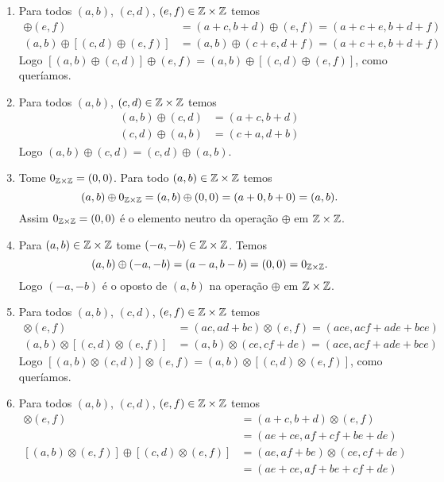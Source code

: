 \documentclass[12pt]{article}
\begin{document}
	\begin{enumerate}
		\item Para todos $(a, b)$, $(c, d)$, $(e, f) \in \mathbb{Z} \times \mathbb{Z}$ temos
		\begin{align*}
			[(a, b) \oplus (c, d)] \oplus (e, f) &= (a + c, b + d) \oplus (e, f) = (a + c + e, b + d + f)\\
			(a, b) \oplus [(c, d) \oplus (e, f)] &= (a, b) \oplus (c + e, d + f) = (a + c + e, b + d + f)
		\end{align*}
		Logo $[(a, b) \oplus (c, d)] \oplus (e, f) = (a, b) \oplus [(c, d) \oplus (e, f)]$, como queríamos.

		\item Para todos $(a, b)$, $(c, d) \in \mathbb{Z} \times \mathbb{Z}$ temos
		\begin{align*}
			(a, b) \oplus (c, d) &= (a + c, b + d)\\
			(c, d) \oplus (a, b) &= (c + a, d + b)
		\end{align*}
		Logo $(a, b) \oplus (c, d) = (c, d) \oplus (a, b)$.

		\item Tome $0_{\mathbb{Z} \times \mathbb{Z}} = (0, 0)$. Para todo $(a, b) \in \mathbb{Z} \times \mathbb{Z}$ temos
		\[
			(a, b) \oplus 0_{\mathbb{Z} \times \mathbb{Z}} = (a, b) \oplus (0, 0) = (a + 0, b + 0) = (a, b).
		\]
		Assim $0_{\mathbb{Z} \times \mathbb{Z}} = (0, 0)$ é o elemento neutro da operação $\oplus$ em $\mathbb{Z} \times \mathbb{Z}$.

		\item Para $(a, b) \in \mathbb{Z} \times \mathbb{Z}$ tome $(-a, -b) \in \mathbb{Z} \times \mathbb{Z}$. Temos
		\[
			(a, b) \oplus (-a, -b) = (a - a, b - b) = (0, 0) = 0_{\mathbb{Z} \times \mathbb{Z}}.
		\]
		Logo $(-a, -b)$ é o oposto de $(a, b)$ na operação $\oplus$ em $\mathbb{Z} \times \mathbb{Z}$.

		\item Para todos $(a, b)$, $(c, d)$, $(e, f) \in \mathbb{Z} \times \mathbb{Z}$ temos
		\begin{align*}
			[(a, b) \otimes (c, d)] \otimes (e, f) &= (ac, ad + bc) \otimes (e, f) = (ace, acf + ade + bce)\\
			(a, b) \otimes [(c, d) \otimes (e, f)] &= (a, b) \otimes (ce, cf + de) = (ace, acf + ade + bce)
		\end{align*}
		Logo $[(a, b) \otimes (c, d)] \otimes (e, f) = (a, b) \otimes [(c, d) \otimes (e, f)]$, como queríamos.

		\item Para todos $(a, b)$, $(c, d)$, $(e, f) \in \mathbb{Z} \times \mathbb{Z}$ temos
		\begin{align*}
			[(a, b) \oplus (c, d)] \otimes (e, f) &= (a + c, b + d) \otimes (e, f) \\& = (ae + ce, af + cf + be + de)\\
			[(a, b) \otimes (e, f)] \oplus [(c, d) \otimes (e, f)] &= (ae, af + be) \otimes (ce, cf + de) \\ &= (ae + ce, af + be + cf + de)
		\end{align*}


\end{enumerate}
\end{document}
